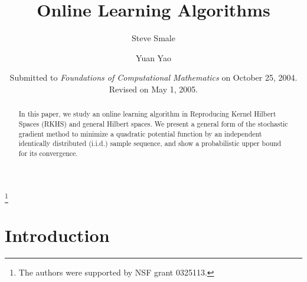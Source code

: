 \documentclass[twoside]{amsart}
\theoremstyle{theorem}
\theoremstyle{definition}
\theoremstyle{remark}
\begin{document}
\title{Online Learning Algorithms}
\thanks{The authors were supported by NSF grant 0325113.}

\author{Steve Smale}
\address{Steve Smale, Toyota Technological Institute at Chicago, 1427 East 60th Street, Chicago, IL
60637.}

\author{Yuan Yao}
\address{Yuan Yao, Department of Mathematics, University of California at Berkeley, Berkeley, CA 94720.}

\date{Submitted to \emph{Foundations of Computational Mathematics} on October 25, 2004. Revised on May 1, 2005.}



\maketitle

\begin{abstract}
In this paper, we study an online learning algorithm in Reproducing Kernel Hilbert Spaces (RKHS) and general Hilbert spaces.
We present a general form of the stochastic gradient method to minimize a quadratic potential function by an
independent identically distributed (i.i.d.) sample sequence, and show a probabilistic upper bound for its convergence.
\end{abstract}

\bigskip




\section{Introduction}

\end{document}
